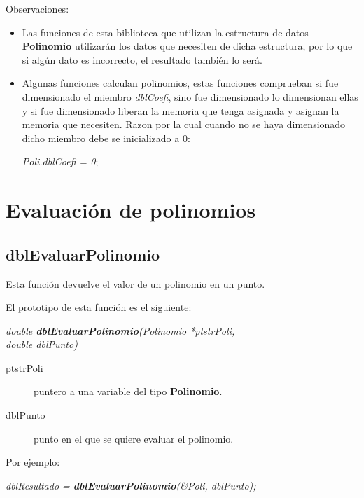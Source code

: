 Observaciones:

\begin{itemize}
\item Las funciones de esta biblioteca que utilizan la estructura de datos
\textbf{Polinomio} utilizar\'an los datos que necesiten de dicha estructura,
por lo que si alg\'un dato es incorrecto, el resultado tambi\'en lo ser\'a.
\item Algunas funciones calculan polinomios, estas funciones 
comprueban si fue dimensionado el miembro \emph{dblCoefi}, sino fue dimensionado
lo dimensionan ellas y si fue dimensionado liberan la memoria que tenga asignada
y asignan la memoria que necesiten. Razon por la cual cuando no se haya
dimensionado dicho miembro debe se inicializado a $0$:

\begin{center}
\emph{Poli.dblCoefi = 0};
\end{center}
\end{itemize}

\section{Evaluaci\'on de polinomios}

\subsection{dblEvaluarPolinomio}

Esta funci\'on devuelve el valor de un polinomio en un punto.\newline

El prototipo de esta funci\'on es el siguiente:

\begin{center}
\emph{double \textbf{dblEvaluarPolinomio}(Polinomio *ptstrPoli,\\
double dblPunto)}
\end{center}

\begin{description} 
\item[ptstrPoli] puntero a una variable del tipo \textbf{Polinomio}. 
\item[dblPunto] punto en el que se quiere evaluar el polinomio.
\end{description}

Por ejemplo:

\begin{center}
\emph{dblResultado = \textbf{dblEvaluarPolinomio}(\&Poli, dblPunto);}
\end{center}

